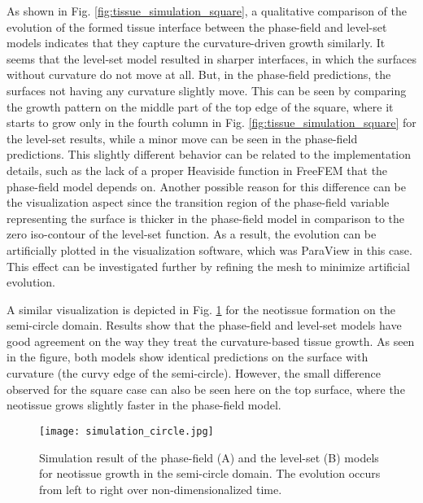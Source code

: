 As shown in Fig. \ref{fig:tissue_simulation_square}, a qualitative comparison of the evolution of the formed tissue interface between the phase-field and level-set models indicates that they capture the curvature-driven growth similarly. It seems that the level-set model resulted in sharper interfaces, in which the surfaces without curvature do not move at all. But, in the phase-field predictions, the surfaces not having any curvature slightly move. This can be seen by comparing the growth pattern on the middle part of the top edge of the square, where it starts to grow only in the fourth column in Fig. \ref{fig:tissue_simulation_square} for the level-set results, while a minor move can be seen in the phase-field predictions. This slightly different behavior can be related to the implementation details, such as the lack of a proper Heaviside function in FreeFEM that the phase-field model depends on. Another possible reason for this difference can be the visualization aspect since the transition region of the phase-field variable representing the surface is thicker in the phase-field model in comparison to the zero iso-contour of the level-set function. As a result, the evolution can be artificially plotted in the visualization software, which was ParaView in this case. This effect can be investigated further by refining the mesh to minimize artificial evolution.

A similar visualization is depicted in Fig. \ref{fig:tissue_simulation_circle} for the neotissue formation on the semi-circle domain. Results show that the phase-field and level-set models have good agreement on the way they treat the curvature-based tissue growth. As seen in the figure, both models show identical predictions on the surface with curvature (the curvy edge of the semi-circle). However, the small difference observed for the square case can also be seen here on the top surface, where the neotissue grows slightly faster in the phase-field model.

\begin{figure}
\centering
\medskip
\texttt{[image: simulation\_circle.jpg]}
\caption[Simulation result of neotissue growth in the semi-circle domain]{Simulation result of the phase-field (A) and the level-set (B) models for neotissue growth in the semi-circle domain. The evolution occurs from left to right over non-dimensionalized time.}
\label{fig:tissue_simulation_circle}
\end{figure}


